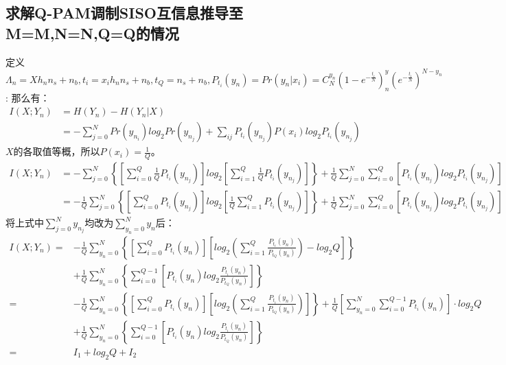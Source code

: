 \documentclass[12pt]{article}
\begin{document}
\subsection{求解Q-PAM调制SISO互信息推导至M=M,N=N,Q=Q的情况}
定义$\Lambda_n=Xh_nn_s+n_b,t_i=x_ih_nn_s+n_b,t_Q=n_s+n_b,P_{t_i}(y_n)=Pr(y_n|x_i)=C^{y_n}_{N}\left(1-e^{-\frac{t_i}{N}}\right)^y_n\left(e^{-\frac{t_i}{N}}\right)^{N-y_n}$:
那么有：
\begin{equation*}
  \begin{aligned}
    I(X;Y_n) &= H(Y_n)-H(Y_n|X) \\
      &= -\sum\limits_{j=0}^{N}Pr(y_n_i)log_2Pr(y_n_j)+\sum_{ij}P_{t_i}(y_n_j)P(x_i)log_2P_{t_i}(y_n_j) 
  \end{aligned}
\end{equation*}
$X$的各取值等概，所以$P(x_i)=\frac{1}{Q}$。
\begin{equation*}
  \begin{aligned}
    I(X;Y_n) &= -\sum\limits_{j=0}^{N}\left\{\left[\sum\limits_{i=0}^Q\frac{1}{Q}P_{t_i}(y_n_j)\right]log_2\left[\sum\limits_{i=1}^Q\frac{1}{Q}P_{t_i}(y_n_j)\right]\right\}+\frac{1}{Q}\sum\limits_{j=0}^N\sum\limits_{i=0}^{Q}\left[P_{t_i}(y_n_j)log_2P_{t_i}(y_n_j)\right]  \\
      &= -\frac{1}{Q}\sum\limits_{j=0}^{N}\left\{\left[\sum\limits_{i=0}^QP_{t_i}(y_n_j)\right]log_2\left[\frac{1}{Q}\sum\limits_{i=1}^QP_{t_i}(y_n_j)\right]\right\}+\frac{1}{Q}\sum\limits_{j=0}^N\sum\limits_{i=0}^{Q}\left[P_{t_i}(y_n_j)log_2P_{t_i}(y_n_j)\right]  
      
  \end{aligned}
\end{equation*}
将上式中$\sum\limits_{j=0}^{N}y_n_j$均改为$\sum\limits_{y_n=0}^{N}y_n$后：
\begin{equation*}
  \begin{aligned}
    I(X;Y_n) =& -\frac{1}{Q}\sum\limits_{y_n=0}^{N}\left\{\left[\sum\limits_{i=0}^QP_{t_i}(y_n)\right]\left[log_2\left(\sum\limits_{i=1}^Q\frac{P_{t_i}(y_n)}{P_{t_Q}(y_n)}\right)-log_2Q\right]\right\} \\
    &+ \frac{1}{Q}\sum\limits_{y_n=0}^{N}\left\{\sum\limits_{i=0}^{Q-1}\left[P_{t_i}(y_n)log_2\frac{P_{t_i}(y_n)}{P_{t_Q}(y_n)}\right]\right\} \\
    =& -\frac{1}{Q}\sum\limits_{y_n=0}^{N}\left\{\left[\sum\limits_{i=0}^QP_{t_i}(y_n)\right]\left[log_2\left(\sum\limits_{i=1}^Q\frac{P_{t_i}(y_n)}{P_{t_Q}(y_n)}\right)\right]\right\} + \frac{1}{Q}\left[\sum\limits_{y_n=0}^{N}\sum\limits_{i=0}^{Q-1}P_{t_i}(y_n)\right]·log_2Q \\
    &+ \frac{1}{Q}\sum\limits_{y_n=0}^{N}\left\{\sum\limits_{i=0}^{Q-1}\left[P_{t_i}(y_n)log_2\frac{P_{t_i}(y_n)}{P_{t_Q}(y_n)}\right]\right\} \\
    =& I_1 + log_2Q + I_2
  \end{aligned}
\end{equation*}
\end{document}
